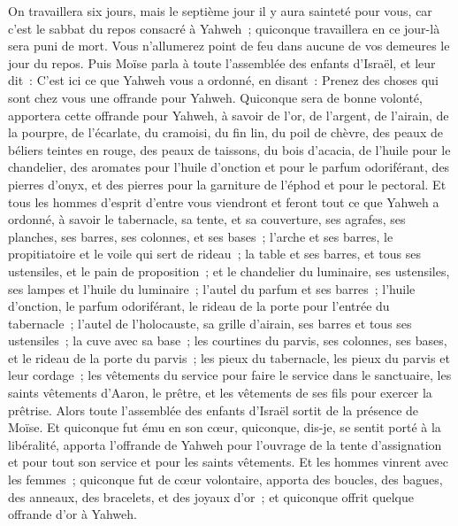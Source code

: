 \begin{multicols}{2}
On travaillera six jours, mais le septième jour il y aura sainteté pour vous, car c'est le sabbat du repos consacré à Yahweh~; quiconque travaillera en ce jour-là sera puni de mort.
Vous n'allumerez point de feu dans aucune de vos demeures le jour du repos.
Puis Moïse parla à toute l'assemblée des enfants d'Israël, et leur dit~: C'est ici ce que Yahweh vous a ordonné, en disant~:
Prenez des choses qui sont chez vous une offrande pour Yahweh. Quiconque sera de bonne volonté, apportera cette offrande pour Yahweh, à savoir de l'or, de l'argent, de l'airain,
de la pourpre, de l'écarlate, du cramoisi, du fin lin, du poil de chèvre,
des peaux de béliers teintes en rouge, des peaux de taissons, du bois d'acacia,
de l'huile pour le chandelier, des aromates pour l'huile d'onction et pour le parfum odoriférant,
des pierres d'onyx, et des pierres pour la garniture de l'éphod et pour le pectoral.
Et tous les hommes d'esprit d'entre vous viendront et feront tout ce que Yahweh a ordonné, 
à savoir le tabernacle, sa tente, et sa couverture, ses agrafes, ses planches, ses barres, ses colonnes, et ses bases~;
l'arche et ses barres, le propitiatoire et le voile qui sert de rideau~;
la table et ses barres, et tous ses ustensiles, et le pain de proposition~;
et le chandelier du luminaire, ses ustensiles, ses lampes et l'huile du luminaire~;
l'autel du parfum et ses barres~; l'huile d'onction, le parfum odoriférant, le rideau de la porte pour l'entrée du tabernacle~;
l'autel de l'holocauste, sa grille d'airain, ses barres et tous ses ustensiles~; la cuve avec sa base~;
les courtines du parvis, ses colonnes, ses bases, et le rideau de la porte du parvis~;
les pieux du tabernacle, les pieux du parvis et leur cordage~;
les vêtements du service pour faire le service dans le sanctuaire, les saints vêtements d'Aaron, le prêtre, et les vêtements de ses fils pour exercer la prêtrise.
Alors toute l'assemblée des enfants d'Israël sortit de la présence de Moïse.
Et quiconque fut ému en son cœur, quiconque, dis-je, se sentit porté à la libéralité, apporta l'offrande de Yahweh pour l'ouvrage de la tente d'assignation et pour tout son service et pour les saints vêtements.
Et les hommes vinrent avec les femmes~; quiconque fut de cœur volontaire, apporta des boucles, des bagues, des anneaux, des bracelets, et des joyaux d'or~; et quiconque offrit quelque offrande d'or à Yahweh.

\end{multicols}
